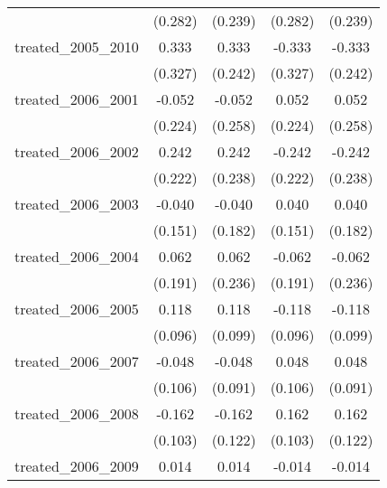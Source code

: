 {\begin{tabular}{l*{4}{c}}
            &     (0.282)         &     (0.239)         &     (0.282)         &     (0.239)         \\
[1em]
treated\_2005\_2010&       0.333         &       0.333         &      -0.333         &      -0.333         \\
            &     (0.327)         &     (0.242)         &     (0.327)         &     (0.242)         \\
[1em]
treated\_2006\_2001&      -0.052         &      -0.052         &       0.052         &       0.052         \\
            &     (0.224)         &     (0.258)         &     (0.224)         &     (0.258)         \\
[1em]
treated\_2006\_2002&       0.242         &       0.242         &      -0.242         &      -0.242         \\
            &     (0.222)         &     (0.238)         &     (0.222)         &     (0.238)         \\
[1em]
treated\_2006\_2003&      -0.040         &      -0.040         &       0.040         &       0.040         \\
            &     (0.151)         &     (0.182)         &     (0.151)         &     (0.182)         \\
[1em]
treated\_2006\_2004&       0.062         &       0.062         &      -0.062         &      -0.062         \\
            &     (0.191)         &     (0.236)         &     (0.191)         &     (0.236)         \\
[1em]
treated\_2006\_2005&       0.118         &       0.118         &      -0.118         &      -0.118         \\
            &     (0.096)         &     (0.099)         &     (0.096)         &     (0.099)         \\
[1em]
treated\_2006\_2007&      -0.048         &      -0.048         &       0.048         &       0.048         \\
            &     (0.106)         &     (0.091)         &     (0.106)         &     (0.091)         \\
[1em]
treated\_2006\_2008&      -0.162         &      -0.162         &       0.162         &       0.162         \\
            &     (0.103)         &     (0.122)         &     (0.103)         &     (0.122)         \\
[1em]
treated\_2006\_2009&       0.014         &       0.014         &      -0.014         &      -0.014         \\

\end{tabular}}
